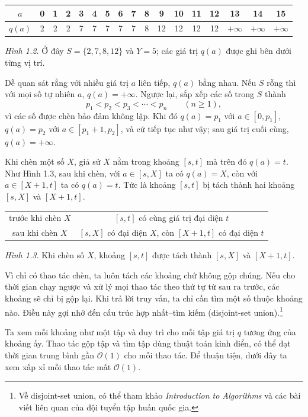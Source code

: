 \documentclass[11pt]{article}
\newcommand{\Oh}{\mathcal{O}}
\begin{document}
\begin{center}
\small
\begin{tabular}{c|cccccccccccccccc}
$a$ & 0&1&2&3&4&5&6&7&8&9&10&11&12&13&14&15\\
\hline
$q(a)$ & 2&2&2&7&7&7&7&7&8&12&12&12&12&
$+\infty$&$+\infty$&$+\infty$
\end{tabular}

\textit{Hình 1.2.} Ở đây $S=\{2,7,8,12\}$ và $Y=5$; các giá trị $q(a)$ được
ghi bên dưới từng vị trí.
\end{center}

Dễ quan sát rằng với nhiều giá trị $a$ liên tiếp, $q(a)$ bằng nhau. Nếu $S$
rỗng thì với mọi số tự nhiên $a$, $q(a)=+\infty$. Ngược lại, sắp xếp các số
trong $S$ thành
\[
  p_1<p_2<p_3<\cdots<p_n\qquad(n\ge 1),
\]
vì các số được chèn bảo đảm không lặp. Khi đó $q(a)=p_1$ với
$a\in[0,p_1]$, $q(a)=p_2$ với $a\in[p_1+1,p_2]$, và cứ tiếp tục như vậy; sau
giá trị cuối cùng, $q(a)=+\infty$.

Khi chèn một số $X$, giả sử $X$ nằm trong khoảng $[s,t]$ mà trên đó $q(a)=t$.
Như Hình 1.3, sau khi chèn, với $a\in[s,X]$ ta có $q(a)=X$, còn với
$a\in[X+1,t]$ ta có $q(a)=t$. Tức là khoảng $[s,t]$ bị tách thành hai khoảng
$[s,X]$ và $[X+1,t]$.

\begin{center}
\small
\begin{tabular}{c|c}
trước khi chèn $X$ & $[s,t]$ có cùng giá trị đại diện $t$ \\
sau khi chèn $X$ & $[s,X]$ có đại diện $X$, còn $[X+1,t]$ có đại diện $t$
\end{tabular}

\textit{Hình 1.3.} Khi chèn số $X$, khoảng $[s,t]$ được tách thành
$[s,X]$ và $[X+1,t]$.
\end{center}

Vì chỉ có thao tác chèn, ta luôn tách các khoảng chứ không gộp chúng. Nếu cho
thời gian chạy ngược và xử lý mọi thao tác theo thứ tự từ sau ra trước, các
khoảng sẽ chỉ bị gộp lại. Khi trả lời truy vấn, ta chỉ cần tìm một số thuộc
khoảng nào. Điều này gợi nhớ đến cấu trúc hợp nhất--tìm kiếm
(disjoint-set union).\footnote{Về disjoint-set union, có thể tham khảo
\textit{Introduction to Algorithms} và các bài viết liên quan của đội tuyển
tập huấn quốc gia.}

Ta xem mỗi khoảng như một tập và duy trì cho mỗi tập giá trị $q$ tương ứng của
khoảng ấy. Thao tác gộp tập và tìm tập dùng thuật toán kinh điển, có thể đạt
thời gian trung bình gần $\Oh(1)$ cho mỗi thao tác. Để thuận tiện, dưới đây ta
xem xấp xỉ mỗi thao tác mất $\Oh(1)$.
\end{document}
